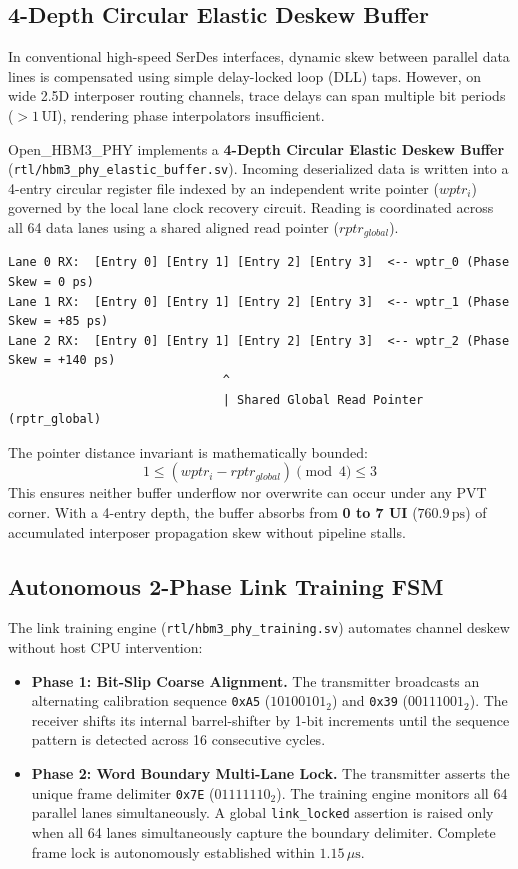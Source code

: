 \documentclass[journal,10pt,twocolumn]{IEEEtran}
\begin{document}
\subsection{4-Depth Circular Elastic Deskew Buffer}

In conventional high-speed SerDes interfaces, dynamic skew between parallel data lines is compensated using simple delay-locked loop (DLL) taps. However, on wide 2.5D interposer routing channels, trace delays can span multiple bit periods ($> 1\,\text{UI}$), rendering phase interpolators insufficient.

Open\_HBM3\_PHY implements a \textbf{4-Depth Circular Elastic Deskew Buffer} (\texttt{rtl/hbm3\_phy\_elastic\_buffer.sv}). Incoming deserialized data is written into a 4-entry circular register file indexed by an independent write pointer ($wptr_i$) governed by the local lane clock recovery circuit. Reading is coordinated across all 64 data lanes using a shared aligned read pointer ($rptr_{global}$).

\begin{footnotesize}\begin{verbatim}
Lane 0 RX:  [Entry 0] [Entry 1] [Entry 2] [Entry 3]  <-- wptr_0 (Phase Skew = 0 ps)
Lane 1 RX:  [Entry 0] [Entry 1] [Entry 2] [Entry 3]  <-- wptr_1 (Phase Skew = +85 ps)
Lane 2 RX:  [Entry 0] [Entry 1] [Entry 2] [Entry 3]  <-- wptr_2 (Phase Skew = +140 ps)
                              ^
                              | Shared Global Read Pointer (rptr_global)
\end{verbatim}\end{footnotesize}

The pointer distance invariant is mathematically bounded:
$$1 \le (wptr_i - rptr_{global}) \pmod 4 \le 3$$
This ensures neither buffer underflow nor overwrite can occur under any PVT corner. With a 4-entry depth, the buffer absorbs from \textbf{0 to 7 UI} ($760.9\,\text{ps}$) of accumulated interposer propagation skew without pipeline stalls.

\subsection{Autonomous 2-Phase Link Training FSM}

The link training engine (\texttt{rtl/hbm3\_phy\_training.sv}) automates channel deskew without host CPU intervention:
\begin{itemize}
  \item \textbf{Phase 1: Bit-Slip Coarse Alignment.} The transmitter broadcasts an alternating calibration sequence \texttt{0xA5} ($10100101_2$) and \texttt{0x39} ($00111001_2$). The receiver shifts its internal barrel-shifter by 1-bit increments until the sequence pattern is detected across 16 consecutive cycles.
  \item \textbf{Phase 2: Word Boundary Multi-Lane Lock.} The transmitter asserts the unique frame delimiter \texttt{0x7E} ($01111110_2$). The training engine monitors all 64 parallel lanes simultaneously. A global \texttt{link\_locked} assertion is raised only when all 64 lanes simultaneously capture the boundary delimiter. Complete frame lock is autonomously established within $1.15\,\mu\text{s}$.
\end{itemize}
\end{document}
